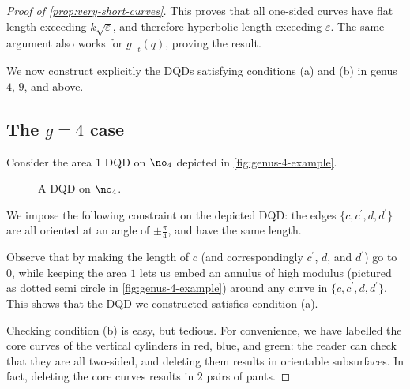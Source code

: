 \documentclass[12pt, reqno]{amsart}
\begin{document}
\begin{proof}[Proof of \autoref{prop:very-short-curves}]
This proves that all one-sided curves have flat length exceeding $k\sqrt{\varepsilon}$, and therefore hyperbolic length exceeding $\varepsilon$.
The same argument also works for $g_{-t}(q)$, proving the result.

We now construct explicitly the DQDs satisfying conditions (a) and (b) in genus $4$, $9$, and above.

\subsection*{The $g=4$ case}

Consider the area $1$ DQD on $\no_4$ depicted in \autoref{fig:genus-4-example}.
\begin{figure}[h]
  \centering
  \caption{A DQD on $\no_4$.}
  \label{fig:genus-4-example}
\end{figure}
We impose the following constraint on the depicted DQD: the edges $\{c, c^{\prime}, d, d^{\prime}\}$ are all oriented at an angle of $\pm \frac{\pi}{4}$, and have the same length.

Observe that by making the length of $c$ (and correspondingly $c^{\prime}$, $d$, and $d^{\prime}$) go to $0$, while keeping the area $1$ lets us embed an annulus of high modulus (pictured as dotted semi circle in \autoref{fig:genus-4-example}) around any curve in $\{c, c^{\prime}, d, d^{\prime}\}$.
This shows that the DQD we constructed satisfies condition (a).

Checking condition (b) is easy, but tedious.
For convenience, we have labelled the core curves of the vertical cylinders in red, blue, and green: the reader can check that they are all two-sided, and deleting them results in orientable subsurfaces.
In fact, deleting the core curves results in $2$ pairs of pants.


\end{proof}
\end{document}
